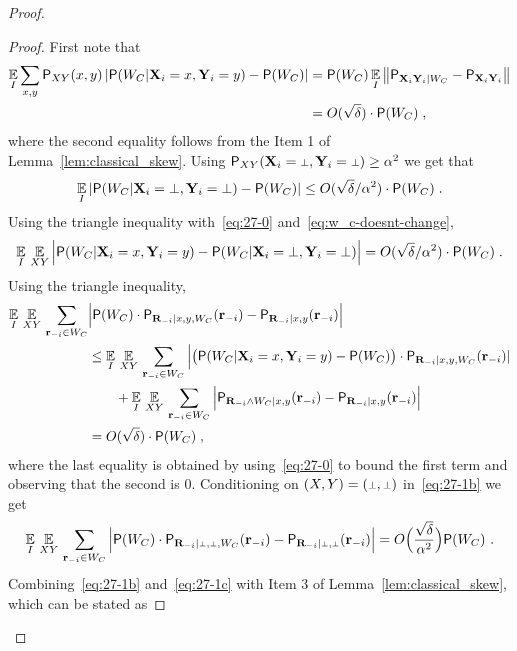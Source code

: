 \begin{proof}
\begin{proof}
First note that
\begin{align}
\nonumber
\operatorname*{\mathbb{E}}_I \sum_{x,y} \mathsf{P}_{XY}(x,y) \left | \mathsf{P} (W_C| \mathbf{X}_i = x,\mathbf{Y}_i = y)-\mathsf{P}(W_C) \right |
&= \mathsf{P}(W_C) \operatorname*{\mathbb{E}}_I  \left \| \mathsf{P}_{\mathbf{X}_i \mathbf{Y}_i |W_C} - \mathsf{P}_{\mathbf{X}_i\mathbf{Y}_i} \right \| \\
\label{eq:27-0}
&= O(\sqrt{\delta}) \cdot \mathsf{P}(W_C)\;,
\end{align}
where the second equality follows from the Item 1 of Lemma~\ref{lem:classical_skew}. Using $\P_{XY}(\bX_i = \dummy, \bY_i = \dummy) \geq \alpha^2$ we get that
\begin{equation}
\label{eq:w_c-doesnt-change}
\Ex_I \left | \P (W_C| \bX_i = \dummy,\bY_i = \dummy)-\P(W_C) \right | \leq O(\sqrt{\delta}/\alpha^2) \cdot \P(W_C)\;.
\end{equation}
Using the triangle inequality with~\eqref{eq:27-0} and~\eqref{eq:w_c-doesnt-change},
\begin{equation}\label{eq:27-1}
\Ex_I \, \Ex_{XY} \Big | \P(W_C| \bX_i = x,\bY_i = y)-\P(W_C | \bX_i = \dummy, \bY_i = \dummy) \Big | = O(\sqrt{\delta}/\alpha^2) \cdot \P(W_C)\;.
\end{equation}
Using the triangle inequality,  
\begin{align}
\operatorname*{\mathbb{E}}_I \, \operatorname*{\mathbb{E}}_{XY} \, \sum_{\mathbf{r}_{-i} \in W_C} &\Big | \mathsf{P}(W_C) \cdot \mathsf{P}_{\mathbf{R}_{-i} | x, y, W_C}(\mathbf{r}_{-i}) - \mathsf{P}_{\mathbf{R}_{-i} | x,y} (\mathbf{r}_{-i}) \Big |\notag \\
 &\leq \operatorname*{\mathbb{E}}_I \, \operatorname*{\mathbb{E}}_{XY} \, \sum_{\mathbf{r}_{-i} \in W_C} \Big | \big(\mathsf{P}(W_C|\mathbf{X}_i = x,\mathbf{Y}_i = y) - \mathsf{P}(W_C)\big) \cdot \mathsf{P}_{\mathbf{R}_{-i} | x, y, W_C}(\mathbf{r}_{-i})  |\notag\\
&\qquad + \operatorname*{\mathbb{E}}_I \, \operatorname*{\mathbb{E}}_{XY} \, \sum_{\mathbf{r}_{-i} \in W_C} \Big |  \mathsf{P}_{\mathbf{R}_{-i} \wedge W_C | x,y}(\mathbf{r}_{-i}) - \mathsf{P}_{\mathbf{R}_{-i} | x,y}(\mathbf{r}_{-i})  \Big |  \notag \\
&= O(\sqrt{\delta}) \cdot \mathsf{P}(W_C)\;,\label{eq:27-1b}
\end{align}
where the last equality is obtained by using~\eqref{eq:27-0} to bound the first term and observing that the second is $0$. 
Conditioning on $(X,Y) = (\dummy,\dummy)$ in~\eqref{eq:27-1b} we get
\begin{align}
\Ex_I \, \Ex_{XY} \, \sum_{\br_\mi\in W_C} \Big | \P(W_C) \cdot \P_{\bR_\mi |  \dummy,  \dummy, W_C}(\br_\mi) - \P_{\bR_\mi |\dummy,  \dummy}(\br_\mi)  \Big | = O\Big(\frac{\sqrt{\delta}}{\alpha^2}\Big) \P(W_C)~.\label{eq:27-1c}
\end{align}
Combining~\eqref{eq:27-1b} and~\eqref{eq:27-1c} with Item 3 of Lemma~\ref{lem:classical_skew}, which can be stated as 

\end{proof}
\end{proof}
